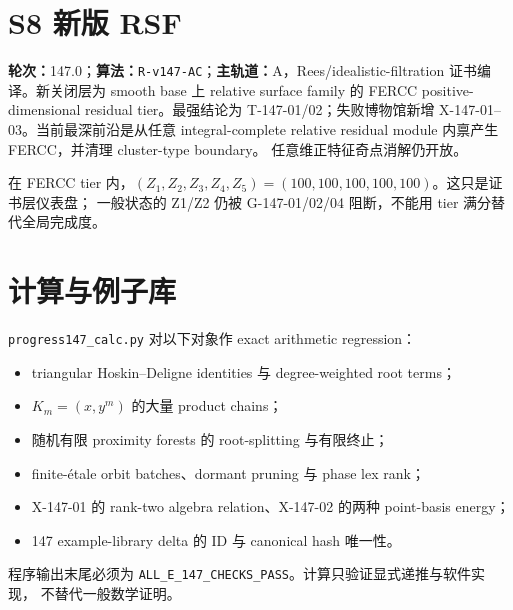 \documentclass[11pt,a4paper,fontset=fandol]{ctexart}
\begin{document}
\section{S8 新版 RSF}
\begin{tcolorbox}[title=RSF v147]
\textbf{轮次：}147.0；\textbf{算法：}\texttt{R-v147-AC}；\textbf{主轨道：}A，Rees/idealistic-filtration
证书编译。新关闭层为 smooth base 上 relative surface family 的 FERCC positive-dimensional
residual tier。最强结论为 T-147-01/02；失败博物馆新增 X-147-01--03。当前最深前沿是从任意
integral-complete relative residual module 内禀产生 FERCC，并清理 cluster-type boundary。
任意维正特征奇点消解仍开放。
\end{tcolorbox}
在 FERCC tier 内，$(Z_1,Z_2,Z_3,Z_4,Z_5)=(100,100,100,100,100)$。这只是证书层仪表盘；
一般状态的 Z1/Z2 仍被 G-147-01/02/04 阻断，不能用 tier 满分替代全局完成度。

\section{计算与例子库}
\texttt{progress147\_calc.py} 对以下对象作 exact arithmetic regression：
\begin{itemize}
\item triangular Hoskin--Deligne identities 与 degree-weighted root terms；
\item $K_m=(x,y^m)$ 的大量 product chains；
\item 随机有限 proximity forests 的 root-splitting 与有限终止；
\item finite-étale orbit batches、dormant pruning 与 phase lex rank；
\item X-147-01 的 rank-two algebra relation、X-147-02 的两种 point-basis energy；
\item 147 example-library delta 的 ID 与 canonical hash 唯一性。
\end{itemize}
程序输出末尾必须为 \texttt{ALL\_E\_147\_CHECKS\_PASS}。计算只验证显式递推与软件实现，
不替代一般数学证明。
\end{document}
